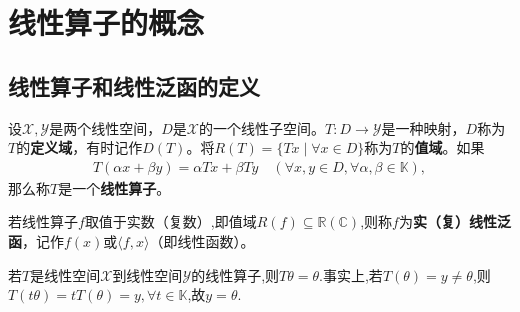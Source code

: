 \documentclass[../../main.tex]{subfiles}%
\begin{document}
\section{线性算子的概念}

\subsection{线性算子和线性泛函的定义}

\begin{definition}[线性算子]
设$\mathscr{X},\mathscr{Y}$是两个线性空间，$D$是$\mathscr{X}$的一个线性子空间。$T:D\to\mathscr{Y}$是一种映射，$D$称为$T$的\textbf{定义域}，有时记作$D(T)$。将$R(T)=\{Tx\mid \forall x\in D\}$称为$T$的\textbf{值域}。如果
\begin{align*}
T(\alpha x+\beta y)=\alpha Tx+\beta Ty\quad (\forall x,y\in D,\forall \alpha,\beta\in\mathbb{K}),
\end{align*}
那么称$T$是一个\textbf{线性算子}。

若线性算子$f$取值于实数（复数）,即值域$R(f)\subseteq \mathbb{R}(\mathbb{C})$,则称$f$为\textbf{实（复）线性泛函}，记作$f(x)$或$\langle f,x\rangle$（即线性函数）。
\end{definition}
\begin{remark}
若$T$是线性空间$\mathscr{X}$到线性空间$\mathscr{Y}$的线性算子,则$T\theta=\theta$.事实上,若$T(\theta)=y\neq \theta$,则$T(t\theta)=tT(\theta)=y,\forall t\in \mathbb{K}$,故$y=\theta$.
\end{remark}
\end{document}
